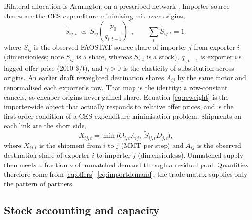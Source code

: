 Bilateral allocation is Armington on a prescribed network
\citep{armington1969}. Importer source shares are the CES
expenditure-minimising mix over origins,
\begin{equation}
\tilde S_{ij,t}\;\propto\;S_{ij}\left(\frac{p_0}{q_{i,t-1}}\right)^{\gamma},
\qquad \sum_i \tilde S_{ij,t}=1,
\label{eq:reweight}
\end{equation}
where \(S_{ij}\) is the observed FAOSTAT source share of importer \(j\)
from exporter \(i\) (dimensionless; note \(S_{ij}\) is a share, whereas
\(S_{i,t}\) is a stock), \(q_{i,t-1}\) is exporter \(i\)'s lagged offer
price (2010 \$/t), and \(\gamma>0\) is the elasticity of substitution
across origins. An earlier draft reweighted destination shares
\(A_{ij}\) by the same factor and renormalised each exporter's row.
That map is the identity: a row-constant cancels, so cheaper origins
never gained share. Equation \eqref{eq:reweight} is the importer-side
object that actually responds to relative offer prices, and is the
first-order condition of a CES expenditure-minimisation problem. Shipments
on each link are the short side,
\begin{equation}
X_{ij,t}=\min\bigl(O_{i,t}A_{ij},\;\tilde S_{ij,t}D_{j,t}\bigr),
\label{eq:clear}
\end{equation}
where \(X_{ij,t}\) is the shipment from \(i\) to \(j\) (MMT per step) and
\(A_{ij}\) is the observed destination share of exporter \(i\) to importer
\(j\) (dimensionless). Unmatched supply then meets a fraction \(\nu\) of
unmatched demand through a residual pool. Quantities therefore come from
\eqref{eq:offers}--\eqref{eq:importdemand}; the trade matrix supplies only
the pattern of partners.

\subsection{Stock accounting and capacity}

